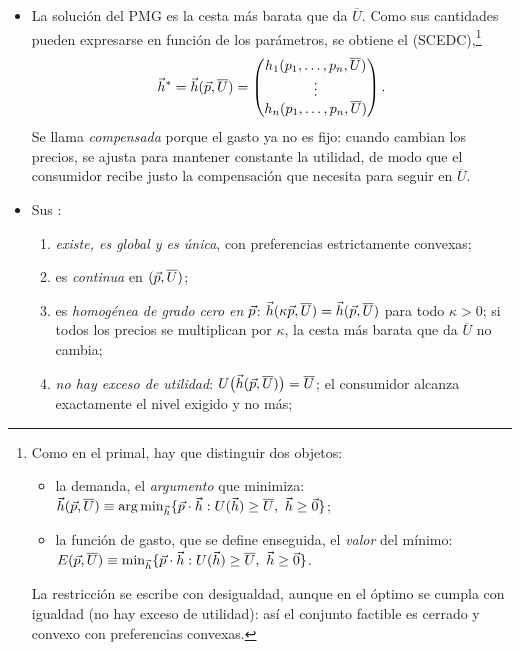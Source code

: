 \documentclass[11pt]{article}
\begin{document}
\begin{itemize}
\item La solución del PMG es la cesta más barata que da $\overline{U}$. Como sus cantidades pueden expresarse en función de los parámetros, se obtiene el  (SCEDC),\footnote{Como en el primal, hay que distinguir dos objetos:
\begin{itemize}
\item la demanda, el \emph{argumento} que minimiza: $\vect{h}(\vect{p},\overline{U})\equiv\arg\min_{\vect{h}}\{\vect{p}\cdot\vect{h}:U(\vect{h})\geq\overline{U},\ \vect{h}\geq\vect{0}\}$;
\item la función de gasto, que se define enseguida, el \emph{valor} del mínimo: $E(\vect{p},\overline{U})\equiv\min_{\vect{h}}\{\vect{p}\cdot\vect{h}:U(\vect{h})\geq\overline{U},\ \vect{h}\geq\vect{0}\}$.
\end{itemize}
La restricción se escribe con desigualdad, aunque en el óptimo se cumpla con igualdad (no hay exceso de utilidad): así el conjunto factible es cerrado y convexo con preferencias convexas.}
  \begin{equation}
  \vec{h}^*=\vec{h}(\vec{p},\overline{U})=\begin{pmatrix} h_1(p_1,\dots,p_n,\overline{U})\\ \vdots\\ h_n(p_1,\dots,p_n,\overline{U})\end{pmatrix}. \label{eq:hicksiana}
  \end{equation}
  Se llama \emph{compensada} porque el gasto ya no es fijo: cuando cambian los precios, se ajusta para mantener constante la utilidad, de modo que el consumidor recibe justo la compensación que necesita para seguir en $\overline{U}$.
\item Sus \nocite{MasColellWhinstonGreen1995}:
  \begin{enumerate}
  \item \emph{existe, es global y es única}, con preferencias estrictamente convexas;
  \item es \emph{continua} en $(\vec{p},\overline{U})$;
  \item es \emph{homogénea de grado cero en $\vec{p}$}: $\vec{h}(\kappa\vec{p},\overline{U})=\vec{h}(\vec{p},\overline{U})$ para todo $\kappa>0$; si todos los precios se multiplican por $\kappa$, la cesta más barata que da $\overline{U}$ no cambia;
  \item \emph{no hay exceso de utilidad}: $U\big(\vec{h}(\vec{p},\overline{U})\big)=\overline{U}$; el consumidor alcanza exactamente el nivel exigido y no más;

\end{enumerate}
\end{itemize}
\end{document}

